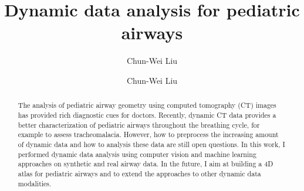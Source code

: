 \documentclass{llncs}
\begin{document}
%
\frontmatter          %
%
\pagestyle{empty}  %
%
\mainmatter              %
%
\title{Dynamic data analysis for pediatric airways}
%
%
\author{Chun-Wei Liu}
%
%
%

\author{Chun-Wei Liu}

\maketitle              %

\begin{abstract}
The analysis of pediatric airway geometry using computed tomography (CT) images has provided rich diagnostic cues for doctors. Recently, dynamic CT data provides a better characterization of pediatric airways throughout the breathing cycle, for example to assess tracheomalacia. However, how to preprocess the increasing amount of dynamic data and how to analysis these data are still open questions. In this work, I performed dynamic data analysis using computer vision and machine learning approaches on synthetic and real airway data. In the future, I aim at building a 4D atlas for pediatric airways and to extend the approaches to other dynamic data modalities.
\end{abstract}


\end{document}
